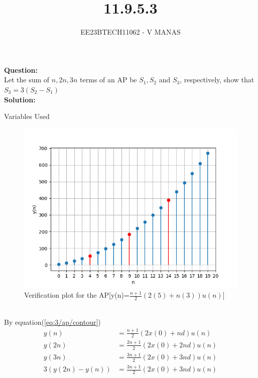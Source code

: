 \documentclass[journal,12pt,twocolumn]{IEEEtran}
\theoremstyle{remark}
\begin{document}

\vspace{3cm}

\title{11.9.5.3}
\author{EE23BTECH11062 - V MANAS}
\maketitle
\newpage

\bigskip
\textbf{Question:}\\Let the sum of $n,2n,3n$ terms of an AP be $S_1,S_2$ and $S_3$, respectively, show that $S_3=3(S_2-S_1)$\\
\textbf{Solution:}
\begin{table}[h]
    \centering
    
    \caption{Variables Used}
    \label{tab:table_11.9.5.3}
\end{table}
\begin{figure}[h]
    \centering
    \includegraphics[width=1.3\linewidth]{figs/graph.png}
    \caption{Verification plot for the AP[y(n)=$\frac{n+1}{2}(2(5)+n(3))u(n)$]}
\end{figure}\\
By equation(\ref{eq:3/ap/contour})
\begin{align}
    y(n)&=\frac{n+1}{2}(2x(0)+nd)u(n)\\
    y(2n)&=\frac{2n+1}{2}(2x(0)+2nd)u(n)\\
    y(3n)&=\frac{3n+1}{2}(2x(0)+3nd)u(n)\\
    3(y(2n)-y(n))&=\frac{3n+1}{2}(2x(0)+3nd)u(n)
\end{align}
\end{document}
